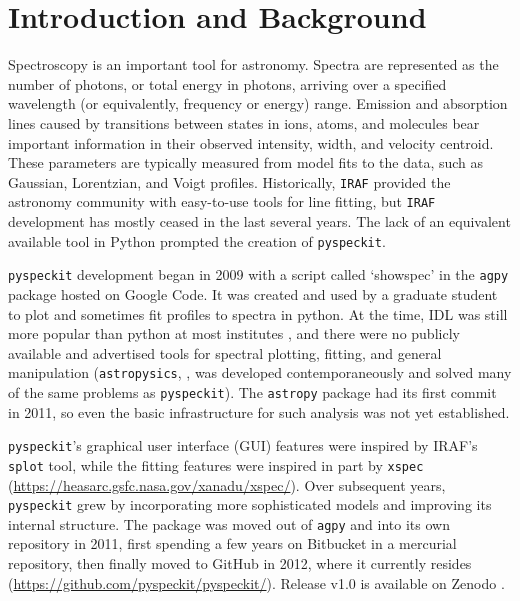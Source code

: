 \documentclass[twocolumn]{aastex63}
\newcommand{\pyspeckit}{\texttt{pyspeckit}\xspace}
\newcommand{\astropy}{\texttt{astropy}\xspace}
\begin{document}
\section{Introduction and Background}
Spectroscopy is an important tool for astronomy. Spectra are represented as
the number of photons, or total energy in photons, arriving over a specified
wavelength (or equivalently, frequency or energy) range. Emission and
absorption lines caused by transitions between states in ions, atoms, and molecules bear important information
in their observed intensity, width, and velocity centroid. These parameters are
typically measured from model fits to the data, such as Gaussian, Lorentzian,
and Voigt profiles. Historically, \texttt{IRAF} \citep{iraf} provided the astronomy
community with easy-to-use tools for line fitting, but \texttt{IRAF}
development has mostly ceased in the last several years.
The lack of an equivalent available
tool in Python prompted the creation of \pyspeckit.


\pyspeckit development began in 2009 with a script called `showspec' in the
\texttt{agpy} package hosted on Google Code. It was created and used by a
graduate student to plot and sometimes fit profiles to spectra in python. At
the time, IDL was still more popular than python at most institutes
\citep[the first evidence
that python had overtaken IDL in popularity among astronomers was presented in
][]{Momcheva2015a}, and there were no publicly available and advertised
tools for spectral plotting, fitting, and general manipulation
(\texttt{astropysics}, \citealt{Tollerud2012a}, was developed contemporaneously and
solved many of the same problems as \pyspeckit). The \astropy package
\citep{AstropyCollaboration2013,AstropyCollaboration2018} had its first commit in
2011, so even the basic infrastructure for such analysis was
not yet established.

\pyspeckit's graphical user interface (GUI) features were inspired by IRAF's
\texttt{splot} tool, while the fitting features were inspired in part by \texttt{xspec}
(\url{https://heasarc.gsfc.nasa.gov/xanadu/xspec/}).  Over subsequent years,
\pyspeckit grew by incorporating more sophisticated models  and improving its
internal structure.  The package was moved out of \texttt{agpy} and into its
own repository in 2011, first spending a few years on Bitbucket in a mercurial
repository, then finally moved to GitHub in 2012, where it currently resides (\url{https://github.com/pyspeckit/pyspeckit/}).
Release v1.0 is available on Zenodo \citep{pyspeckitV1}.
\end{document}
